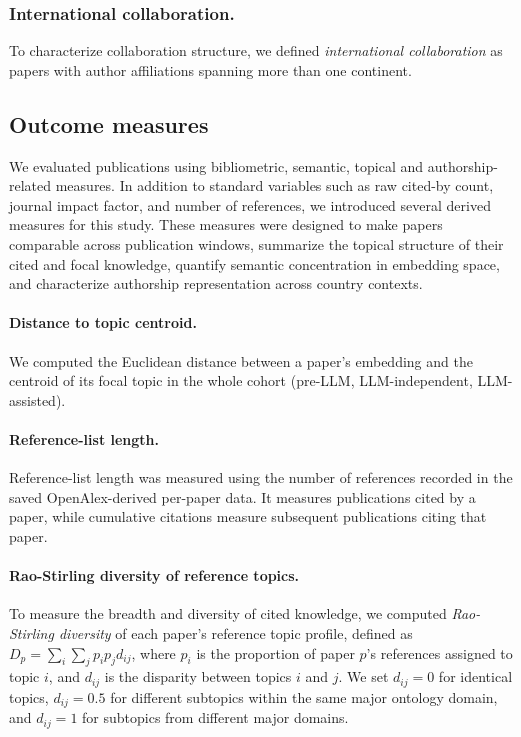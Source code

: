 \subsubsection*{International collaboration.}

To characterize collaboration structure, we defined \textit{international collaboration} as papers with author affiliations spanning more than one continent.


\subsection*{Outcome measures}


We evaluated publications using bibliometric, semantic, topical and authorship-related measures.
In addition to standard variables such as raw cited-by count, journal impact factor, and number of references, we introduced several derived measures for this study. These measures were designed to make papers comparable across publication windows, summarize the topical structure of their cited and focal knowledge, quantify semantic concentration in embedding space, and characterize authorship representation across country contexts.

\paragraph{Distance to topic centroid.}
We computed the Euclidean distance between a paper's embedding and the centroid of its focal topic in the whole cohort (pre-LLM, LLM-independent, LLM-assisted).

\paragraph{Reference-list length.} Reference-list length was measured using the number of references recorded in the saved OpenAlex-derived per-paper data. It measures publications cited by a paper, while cumulative citations measure subsequent publications citing that paper.

\paragraph{Rao-Stirling diversity of reference topics.}
To measure the breadth and diversity of cited knowledge, we computed \textit{Rao-Stirling diversity} of each paper's reference topic profile, defined as $D_p = \sum_i \sum_j p_i p_j d_{ij}$, where $p_i$ is the proportion of paper $p$'s references assigned to topic $i$, and $d_{ij}$ is the disparity between topics $i$ and $j$. We set $d_{ij}=0$ for identical topics, $d_{ij}=0.5$ for different subtopics within the same major ontology domain, and $d_{ij}=1$ for subtopics from different major domains.

